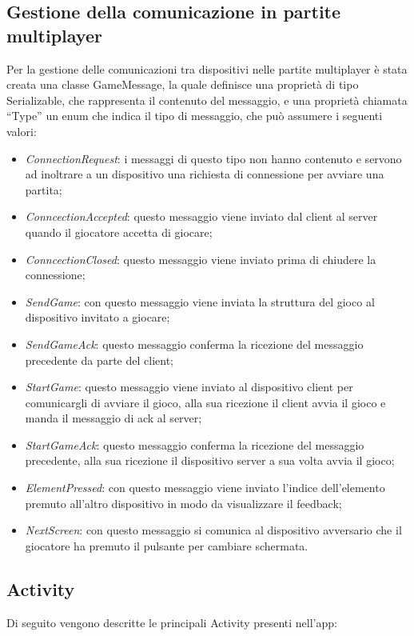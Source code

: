 \subsection{Gestione della comunicazione in partite multiplayer}
\noindent Per la gestione delle comunicazioni tra dispositivi nelle partite multiplayer \`{e} stata creata una classe GameMessage, la quale definisce una propriet\`{a} di tipo Serializable, che rappresenta il contenuto del messaggio, e una propriet\`{a} chiamata ``Type'' un enum che indica il tipo di messaggio, che pu\`{o} assumere i seguenti valori:
\begin{itemize}
\item \emph{ConnectionRequest}: i messaggi di questo tipo non hanno contenuto e servono ad inoltrare a un dispositivo una richiesta di connessione per avviare una partita;
\item \emph{ConncectionAccepted}: questo messaggio viene inviato dal client al server quando il giocatore accetta di giocare;
\item \emph{ConncectionClosed}: questo messaggio viene inviato prima di chiudere la connessione;
\item \emph{SendGame}: con questo messaggio viene inviata la struttura del gioco al dispositivo invitato a giocare;
\item \emph{SendGameAck}: questo messaggio conferma la ricezione del messaggio precedente da parte del client;
\item \emph{StartGame}: questo messaggio viene inviato al dispositivo client per comunicargli di avviare il gioco, alla sua ricezione il client avvia il gioco e manda il messaggio di ack al server;
\item \emph{StartGameAck}: questo messaggio conferma la ricezione del messaggio precedente, alla sua ricezione il dispositivo server a sua volta avvia il gioco;
\item \emph{ElementPressed}: con questo messaggio viene inviato l'indice dell'elemento premuto all'altro dispositivo in modo da visualizzare il feedback;
\item \emph{NextScreen}: con questo messaggio si comunica al dispositivo avversario che il giocatore ha premuto il pulsante per cambiare schermata.
\end{itemize}

\subsection{Activity}

\noindent Di seguito vengono descritte le principali Activity presenti nell'app:

